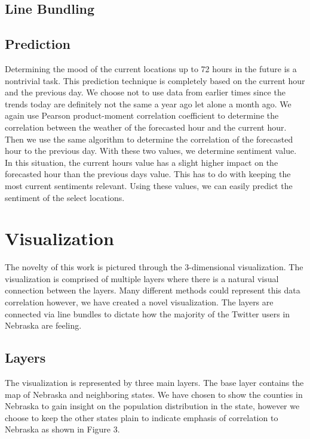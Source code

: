 \documentclass[journal]{vgtc}                %
\begin{document}
\subsection{Line Bundling}

\newpage


\subsection{Prediction}
Determining the mood of the current locations up to 72 hours in the future is a nontrivial task. This prediction technique is completely based on the current hour and the previous day. We choose not to use data from earlier times since the trends today are definitely not the same a year ago let alone a month ago. We again use Pearson product-moment correlation coefficient to determine the correlation between the weather of the forecasted hour and the current hour. Then we use the same algorithm to determine the correlation of the forecasted hour to the previous day. With these two values, we determine sentiment value. In this situation, the current hours value has a slight higher impact on the forecasted hour  than the previous days value. This has to do with keeping the most current sentiments relevant. Using these values, we can easily predict the sentiment of the select locations.



\section{Visualization}
The novelty of this work is pictured through the 3-dimensional visualization. The visualization is comprised of multiple layers where there is a natural visual connection between the layers. Many different methods could represent this data correlation however, we have created a novel visualization. The layers are connected via line bundles to dictate how the majority of the Twitter users in Nebraska are feeling.

\subsection{Layers}
The visualization is represented by three main layers. The base layer contains the map of Nebraska and neighboring states. We have chosen to show the counties in Nebraska to gain insight on the population distribution in the state, however we choose to keep the other states plain to indicate emphasis of correlation to Nebraska as shown in Figure 3.
\end{document}
